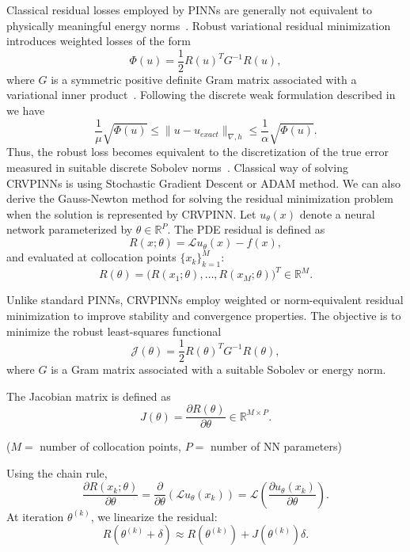 \documentclass[review]{elsarticle}
\begin{document}
Classical residual losses employed by PINNs are generally not equivalent to physically meaningful energy norms~\cite{rvpinn}. Robust variational residual minimization introduces weighted losses of the form
\begin{equation}
 \Phi(u)=\frac12 R(u)^T G^{-1}R(u),
\end{equation}
where $G$ is a symmetric positive definite Gram matrix associated with a variational inner product~\cite{rvpinn,crvpinn}.
Following the discrete weak formulation described in \cite{crvpinn} we have 
\begin{equation}
\frac{1}{\mu}\sqrt{ \Phi(u)}
\le
\|u-u_{exact}\|_{\nabla,h}
\le
\frac{1}{\alpha}\sqrt{ \Phi(u)}.
\end{equation}
Thus, the robust loss becomes equivalent to the discretization of the true error measured in suitable discrete Sobolev norms~\cite{crvpinn}. Classical way of solving CRVPINNs is using Stochastic Gradient Descent or ADAM \cite{Adam} method.
We can also derive the Gauss-Newton method for solving the residual minimization problem when the solution is represented by CRVPINN.
Let $u_\theta(x)$ denote a neural network parameterized by
$\theta \in \mathbb{R}^P$.
The PDE residual is defined as
\begin{equation}
R(x;\theta) = \mathcal{L}u_\theta(x)-f(x),
\end{equation}
and evaluated at collocation points $\{x_k\}_{k=1}^M$:
\begin{equation}
R(\theta)
=
\big(
R(x_1;\theta),
\dots,
R(x_M;\theta)
\big)^T
\in
\mathbb{R}^M.
\end{equation}

Unlike standard PINNs, CRVPINNs employ weighted or norm-equivalent residual minimization to improve stability and convergence properties.
The objective is to minimize the robust least-squares functional
\begin{equation}
\mathcal{J}(\theta)
=
\frac12
R(\theta)^T
G^{-1}
R(\theta),
\end{equation}
where $G$ is a Gram matrix associated with a suitable Sobolev or energy norm.

The Jacobian matrix is defined as
\begin{equation}
J(\theta)
=
\frac{\partial R(\theta)}{\partial \theta}
\in
\mathbb{R}^{M \times P}.
\end{equation}

($M=$ number of collocation points,\quad
$P=$ number of NN parameters)


Using the chain rule,
\begin{equation}
\frac{\partial R(x_k;\theta)}{\partial \theta}
=
\frac{\partial}{\partial \theta}
\left(
\mathcal{L}u_\theta(x_k)
\right)
=
\mathcal{L}
\left(
\frac{\partial u_\theta(x_k)}{\partial \theta}
\right).
\end{equation}
At iteration $\theta^{(k)}$, we linearize the residual:
\begin{equation}
R(\theta^{(k)}+\delta)
\approx
R(\theta^{(k)})
+
J(\theta^{(k)})\delta.
\end{equation}
\end{document}
